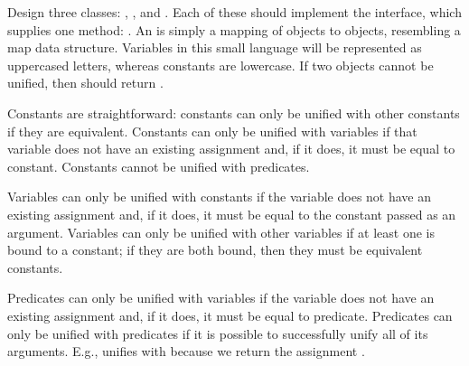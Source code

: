 Design three classes: , , and . Each of these should implement the  interface, which supplies one method: . An  is simply a mapping of  objects to  objects, resembling a map data structure. Variables in this small language will be represented as uppercased letters, whereas constants are lowercase. If two  objects cannot be unified, then  should return .

Constants are straightforward: constants can only be unified with other constants if they are equivalent. Constants can only be unified with variables if that variable does not have an existing assignment and, if it does, it must be equal to  constant. Constants cannot be unified with predicates.

Variables can only be unified with constants if the variable does not have an existing assignment and, if it does, it must be equal to the constant passed as an argument. Variables can only be unified with other variables if at least one is bound to a constant; if they are both bound, then they must be equivalent constants. 

Predicates can only be unified with variables if the variable does not have an existing assignment and, if it does, it must be equal to  predicate. Predicates can only be unified with predicates if it is possible to successfully unify all of its arguments. E.g.,  unifies with  because we return the assignment . 


